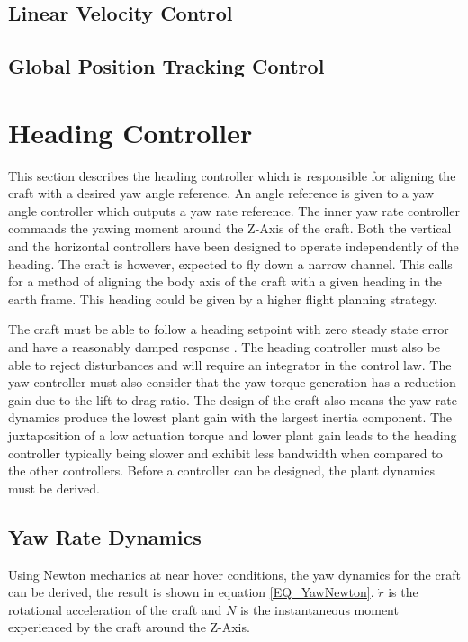 \documentclass[12pt]{report}
\begin{document}
\subsection{Linear Velocity Control}

\subsection{Global Position Tracking Control}

\section{Heading Controller}
This section describes the heading controller which is responsible for aligning the craft with a desired yaw angle reference. An angle reference is given to a yaw angle controller which outputs a yaw rate reference. The inner yaw rate controller commands the yawing moment around the Z-Axis of the craft. Both the vertical and the horizontal controllers have been designed to operate independently of the heading. The craft is however, expected to fly down a narrow channel. This calls for a method of aligning the body axis of the craft with a given heading in the earth frame. This heading could be given by a higher flight planning strategy.

The craft must be able to follow a heading setpoint with zero steady state error and have a reasonably damped response . The heading controller must also be able to reject disturbances and will require an integrator in the control law. The yaw controller must also consider that the yaw torque generation has a reduction gain due to the lift to drag ratio. The design of the craft also means the yaw rate dynamics produce the lowest plant gain with the largest inertia component. The juxtaposition of a low actuation torque and lower plant gain leads to the heading controller typically being slower and exhibit less bandwidth when compared to the other controllers. Before a controller can be designed, the plant dynamics must be derived.

\subsection{Yaw Rate Dynamics}
Using Newton mechanics at near hover conditions, the yaw dynamics for the craft can be derived, the result is shown in equation \eqref{EQ_YawNewton}. $\dot{r}$ is the rotational acceleration of the craft and $N$ is the instantaneous moment experienced by the craft around the Z-Axis.
\end{document}
